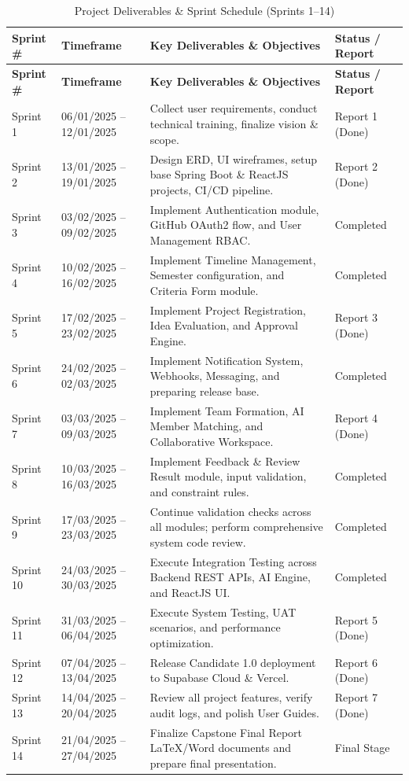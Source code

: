 \begin{footnotesize}
\begin{longtable}{|p{1.1cm}|p{2.4cm}|p{5.6cm}|p{2cm}|}
\caption{Project Deliverables \& Sprint Schedule (Sprints 1--14)}\label{tab:sprints}\\
\hline
\hline
\textbf{Sprint \#} & \textbf{Timeframe} & \textbf{Key Deliverables \& Objectives} & \textbf{Status / Report} \\
\hline
\hline
\endfirsthead
\hline
\textbf{Sprint \#} & \textbf{Timeframe} & \textbf{Key Deliverables \& Objectives} & \textbf{Status / Report} \\
\hline
\hline
\endhead
Sprint 1 & 06/01/2025 -- 12/01/2025 & Collect user requirements, conduct technical training, finalize vision \& scope. & Report 1 (Done) \\
\hline
Sprint 2 & 13/01/2025 -- 19/01/2025 & Design ERD, UI wireframes, setup base Spring Boot \& ReactJS projects, CI/CD pipeline. & Report 2 (Done) \\
\hline
Sprint 3 & 03/02/2025 -- 09/02/2025 & Implement Authentication module, GitHub OAuth2 flow, and User Management RBAC. & Completed \\
\hline
Sprint 4 & 10/02/2025 -- 16/02/2025 & Implement Timeline Management, Semester configuration, and Criteria Form module. & Completed \\
\hline
Sprint 5 & 17/02/2025 -- 23/02/2025 & Implement Project Registration, Idea Evaluation, and Approval Engine. & Report 3 (Done) \\
\hline
Sprint 6 & 24/02/2025 -- 02/03/2025 & Implement Notification System, Webhooks, Messaging, and preparing release base. & Completed \\
\hline
Sprint 7 & 03/03/2025 -- 09/03/2025 & Implement Team Formation, AI Member Matching, and Collaborative Workspace. & Report 4 (Done) \\
\hline
Sprint 8 & 10/03/2025 -- 16/03/2025 & Implement Feedback \& Review Result module, input validation, and constraint rules. & Completed \\
\hline
Sprint 9 & 17/03/2025 -- 23/03/2025 & Continue validation checks across all modules; perform comprehensive system code review. & Completed \\
\hline
Sprint 10 & 24/03/2025 -- 30/03/2025 & Execute Integration Testing across Backend REST APIs, AI Engine, and ReactJS UI. & Completed \\
\hline
Sprint 11 & 31/03/2025 -- 06/04/2025 & Execute System Testing, UAT scenarios, and performance optimization. & Report 5 (Done) \\
\hline
Sprint 12 & 07/04/2025 -- 13/04/2025 & Release Candidate 1.0 deployment to Supabase Cloud \& Vercel. & Report 6 (Done) \\
\hline
Sprint 13 & 14/04/2025 -- 20/04/2025 & Review all project features, verify audit logs, and polish User Guides. & Report 7 (Done) \\
\hline
Sprint 14 & 21/04/2025 -- 27/04/2025 & Finalize Capstone Final Report LaTeX/Word documents and prepare final presentation. & Final Stage \\
\hline
\hline
\end{longtable}
\end{footnotesize}

